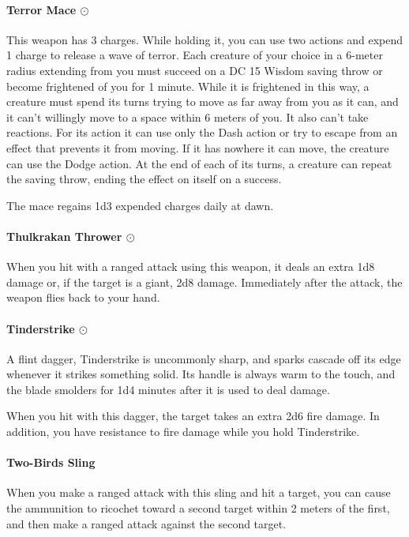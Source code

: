     \paragraph{Terror Mace $\odot$}
        This weapon has 3 charges.
        While holding it, you can use two actions and expend 1 charge to release a wave of terror.
        Each creature of your choice in a 6-meter radius extending from you must succeed on a DC 15 Wisdom saving throw or become frightened of you for 1 minute.
        While it is frightened in this way, a creature must spend its turns trying to move as far away from you as it can, and it can't willingly move to a space within 6 meters of you.
        It also can't take reactions.
        For its action it can use only the Dash action or try to escape from an effect that prevents it from moving.
        If it has nowhere it can move, the creature can use the Dodge action.
        At the end of each of its turns, a creature can repeat the saving throw, ending the effect on itself on a success.

        The mace regains 1d3 expended charges daily at dawn.
    \paragraph{Thulkrakan Thrower $\odot$}
        When you hit with a ranged attack using this weapon, it deals an extra 1d8 damage or, if the target is a giant, 2d8 damage.
        Immediately after the attack, the weapon flies back to your hand.
    \paragraph{Tinderstrike $\odot$}
        A flint dagger, Tinderstrike is uncommonly sharp, and sparks cascade off its edge whenever it strikes something solid.
        Its handle is always warm to the touch, and the blade smolders for 1d4 minutes after it is used to deal damage.

        When you hit with this dagger, the target takes an extra 2d6 fire damage.
        In addition, you have resistance to fire damage while you hold Tinderstrike.
    \paragraph{Two-Birds Sling}
        When you make a ranged attack with this sling and hit a target, you can cause the ammunition to ricochet toward a second target within 2 meters of the first, and then make a ranged attack against the second target.
